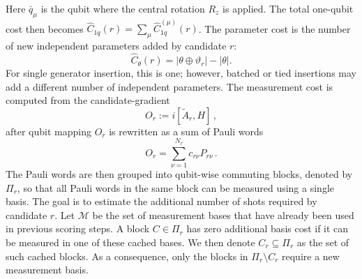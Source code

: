 \documentclass[
  reprint,
  amsmath,
  amssymb,
  aps,
  pra,
  nofootinbib,
  superscriptaddress,
  floatfix
]{revtex4-2}
\begin{document}
%
Here \(\bar{q}_{\mu}\) is the qubit where the central rotation \(R_z\) is applied. The total one-qubit cost then becomes \(\widehat{C}_{1q}(r)=\sum_\mu\widehat{C}_{1q}^{(\mu)}(r)\). The parameter cost is the number of new independent parameters added by candidate \(r\):
%
\begin{equation}
\widehat C_\theta(r)
=
|\theta\oplus\vartheta_r|-|\theta|.
\label{eq:parameter_cost_proxy}
\end{equation}
%
For single generator insertion, this is one; however, batched or tied insertions may add a different number of independent parameters. The measurement cost is computed from the candidate-gradient\cite{Verteletskyi2020CliqueCover,Yen2020CompatibleMeasurements}
\[
O_r:=i[\widetilde A_r,H]\,,
\]
after qubit mapping \(O_r\) is rewritten as a sum of Pauli words 
%
\[
O_r=\sum_{\nu=1}^{N_r}c_{r\nu}P_{r\nu}\,.
\]
%
The Pauli words are then grouped into qubit-wise commuting blocks, denoted by \(\Pi_r\), so that all Pauli words in the same block can be measured using a single basis. The goal is to estimate the additional number of shots required by candidate \(r\). Let \(\mathcal M\) be the set of measurement bases that have already been used in previous scoring steps. A block \(C\in\Pi_r\) has zero additional basis cost if it can be measured in one of these cached bases. We then denote \(C_r\subseteq\Pi_r\) as the set of such cached blocks. As a consequence, only the blocks in \(\Pi_r\setminus C_r\) require a new measurement basis.
\end{document}
